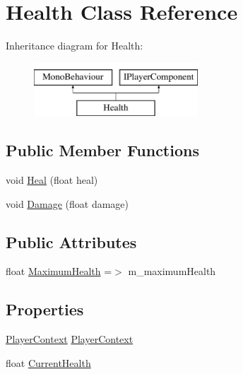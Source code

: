 \hypertarget{class_health}{}\section{Health Class Reference}
\label{class_health}
Inheritance diagram for Health\+:\begin{figure}[H]
\begin{center}
\leavevmode
\includegraphics[height=2.000000cm]{class_health}
\end{center}
\end{figure}
\subsection*{Public Member Functions}
\begin{DoxyCompactItemize}
\item 
void \mbox{\hyperlink{class_health_a6cfe21665a630cf40a67fdd56c4a9a60}{Heal}} (float heal)
\item 
void \mbox{\hyperlink{class_health_a564fd67be57689e737a7415a423293f4}{Damage}} (float damage)
\end{DoxyCompactItemize}
\subsection*{Public Attributes}
\begin{DoxyCompactItemize}
\item 
float \mbox{\hyperlink{class_health_a7aca7e37f7b84aaa4f815b7f9a8457ee}{Maximum\+Health}} =$>$ m\+\_\+maximum\+Health
\end{DoxyCompactItemize}
\subsection*{Properties}
\begin{DoxyCompactItemize}
\item 
\mbox{\hyperlink{class_player_context}{Player\+Context}} \mbox{\hyperlink{class_health_ae265f425011ff7c815be2719e4b7d9bd}{Player\+Context}}
\item 
float \mbox{\hyperlink{class_health_a11b1051941751e881065ecc8f87045af}{Current\+Health}}
\end{DoxyCompactItemize}
